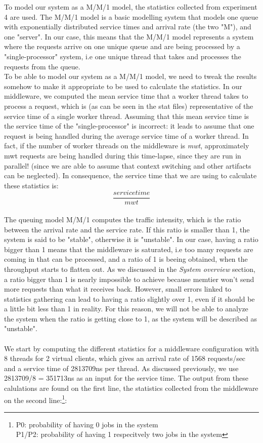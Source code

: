 \documentclass[11pt,a4paper]{article}
\begin{document}
To model our system as a M/M/1 model, the statistics collected from experiment 4 are used. 
The M/M/1 model is a basic modelling system that models one queue with exponentially distributed  service times and arrival rate (the two "M"), and one "server". In our case, this means that the M/M/1 model represents a system where the requests arrive on one unique queue and are being processed by a "single-processor" system, i.e one unique thread that takes and processes the requests from the queue.
\\
To be able to model our system as a M/M/1 model, we need to tweak the results somehow to make it appropriate to be used to calculate the statistics. In our middleware, we computed the mean service time that a worker thread takes to process a request, which is (as can be seen in the stat files) representative of the service time of a single worker thread. Assuming that this mean service time is the service time of the "single-processor" is incorrect: it leads to assume that one request is being handled during the average service time of a worker thread. In fact, if the number of worker threads on the middleware is \textit{mwt}, approximately {mwt} requests are being handled during this time-lapse, since they are run in parallel! (since we are able to assume that context switching and other artifacts can be neglected). In consequence, the service time that we are using to calculate these statistics is: 
\[\frac{service time}{mwt}\]
\\
The queuing model M/M/1 computes the traffic intensity, which is the ratio between the arrival rate and the service rate. If this ratio is smaller than 1, the system is said to be "stable", otherwise it is "unstable". In our case, having a ratio bigger than 1 means that the middleware is saturated, i.e too many requests are coming in that can be processed, and a ratio of 1 is beeing obtained, when the throughput starts to flatten out. As we discussed in the \textit{System overview} section, a ratio bigger than 1 is nearly impossible to achieve because memtier won't send more requests than what it receives back. However, small errors linked to statistics gathering can lead to having a ratio slightly over 1, even if it should be a little bit less than 1 in reality. For this reason, we will not be able to analyze the system when the ratio is getting close to 1, as the system will be described as "unstable".
\\\\
We start by computing the different statistics for a middleware configuration with 8 threads for 2 virtual clients, which gives an arrival rate of 1568 requests/sec and a service time of 2813709ns per thread. As discussed previously, we use 2813709/8 = 351713ns as an input for the service time. The output from these calulations are found on the first line, the statistics collected from the middleware on the second line:\footnote{P0: probability of having 0 jobs in the system\\P1/P2: probability of having 1 respecitvely two jobs in the system}: 
\end{document}
